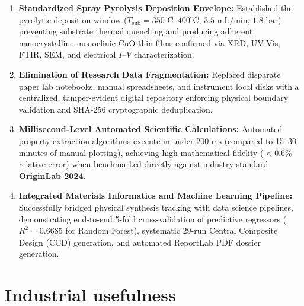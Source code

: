 \documentclass[12pt,a4paper,oneside]{report}
\begin{document}
{{{\begin{enumerate}
    \item \textbf{Standardized Spray Pyrolysis Deposition Envelope:} Established the pyrolytic deposition window ($T_{\text{sub}} = 350^\circ\text{C}\text{--}400^\circ\text{C}$, $3.5\text{ mL/min}$, $1.8\text{ bar}$) preventing substrate thermal quenching and producing adherent, nanocrystalline monoclinic $\text{CuO}$ thin films confirmed via XRD, UV-Vis, FTIR, SEM, and electrical $I\text{--}V$ characterization.
    \item \textbf{Elimination of Research Data Fragmentation:} Replaced disparate paper lab notebooks, manual spreadsheets, and instrument local disks with a centralized, tamper-evident digital repository enforcing physical boundary validation and SHA-256 cryptographic deduplication.
    \item \textbf{Millisecond-Level Automated Scientific Calculations:} Automated property extraction algorithms execute in under $200\text{ ms}$ (compared to 15–30 minutes of manual plotting), achieving high mathematical fidelity ($< 0.6\%$ relative error) when benchmarked directly against industry-standard \textbf{OriginLab 2024}.
    \item \textbf{Integrated Materials Informatics and Machine Learning Pipeline:} Successfully bridged physical synthesis tracking with data science pipelines, demonstrating end-to-end 5-fold cross-validation of predictive regressors ($R^2 = 0.6685$ for Random Forest), systematic 29-run Central Composite Design (CCD) generation, and automated ReportLab PDF dossier generation.
\end{enumerate}

\section{Industrial usefulness}

}}}
\end{document}
